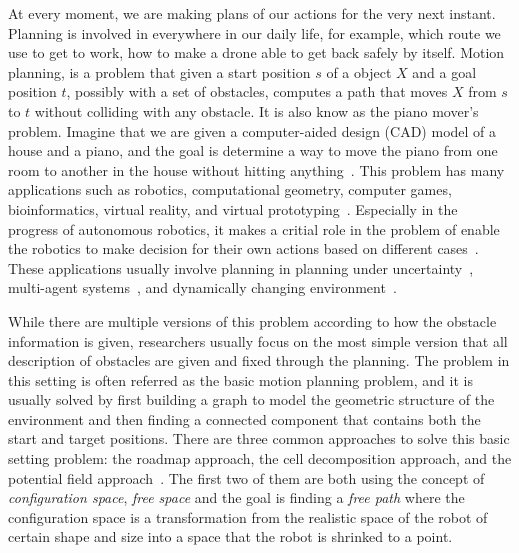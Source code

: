 
At every moment, we are making plans of our actions for the very next instant.
Planning is involved in everywhere in our daily life, for example, which route we use to get to work, how to make a drone able to get back safely by itself.
Motion planning, is a problem that given a start position \(s\) of a object \(X\) and a goal position \(t\), possibly with a set of obstacles, computes a path that moves \(X\) from \(s\) to \(t\) without colliding with any obstacle.
It is also know as the piano mover's problem.
Imagine that we are given a computer-aided design (CAD) model of a house and a piano, and the goal is determine a way to move the piano from one room to another in the house without hitting anything~\cite{lavalle2006planning}.
This problem has many applications such as robotics, computational geometry, computer games, bioinformatics, virtual reality, and virtual prototyping~\cite{latombe2012robot}. Especially in the progress of autonomous robotics, it makes a critial role in the problem of enable the robotics to make decision for their own actions based on different cases~\cite{eric98}. These applications usually involve planning in planning under uncertainty~\cite{kaelbling2013integrated}, multi-agent systems~\cite{bourgault2002information}, and dynamically changing environment~\cite{van2005creating}.

While there are multiple versions of this problem according to how the obstacle information is given, researchers usually focus on the most simple version that all description of obstacles are given and fixed through the planning.
The problem in this setting is often referred as the basic motion planning problem, and it is usually solved by first building a graph to model the geometric structure of the environment and then finding a connected component that contains both the start and target positions. There are three common approaches to solve this basic setting problem: the roadmap approach, the cell decomposition approach, and the potential field approach~\cite{eric98}. The first two of them are both using the concept of \textit{configuration space}, \textit{free space} and the goal is finding a \textit{free path} where the configuration space is a transformation from the realistic space of the robot of certain shape and size into a space that the robot is shrinked to a point.

